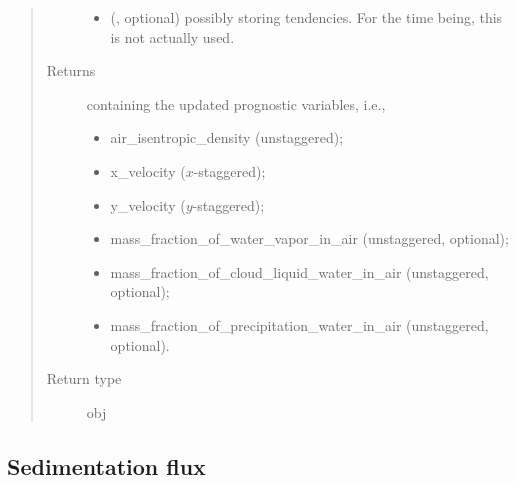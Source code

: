 \documentclass[letterpaper,10pt,english]{sphinxmanual}
\begin{document}
\begin{fulllineitems}
\begin{fulllineitems}
\begin{quote}
\begin{description}
\begin{itemize}
\item {} 
 (, optional) \textendash{} {\hyperref[\detokenize{api:storages.grid_data.GridData}]{}} possibly storing tendencies.
For the time being, this is not actually used.

\end{itemize}

\item[{Returns}] \leavevmode

{\hyperref[\detokenize{api:storages.state_isentropic.StateIsentropic}]{}} containing the updated prognostic variables, i.e.,
\begin{itemize}
\item {} 
air\_isentropic\_density (unstaggered);

\item {} 
x\_velocity (\(x\)-staggered);

\item {} 
y\_velocity (\(y\)-staggered);

\item {} 
mass\_fraction\_of\_water\_vapor\_in\_air (unstaggered, optional);

\item {} 
mass\_fraction\_of\_cloud\_liquid\_water\_in\_air (unstaggered, optional);

\item {} 
mass\_fraction\_of\_precipitation\_water\_in\_air (unstaggered, optional).

\end{itemize}


\item[{Return type}] \leavevmode
obj

\end{description}\end{quote}

\end{fulllineitems}


\end{fulllineitems}



\subsection{Sedimentation flux}
\label{\detokenize{api:sedimentation-flux}}
\end{document}
